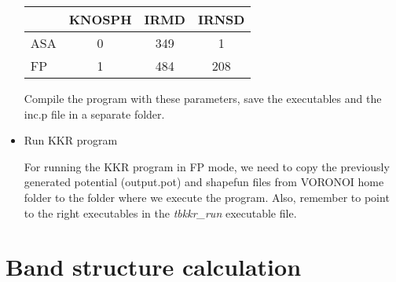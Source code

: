 \documentclass[a4paper,10pt,fullpage]{report}
\begin{document}
\begin{itemize}
\begin{tabular}{ l | c | c |  c }
      & KNOSPH & IRMD & IRNSD \\
  \hline    
  ASA & 0 & 349 & 1 \\
  FP  & 1 & 484 & 208 \\
\end{tabular}

Compile the program with these parameters, save the executables and the inc.p file
in a separate folder.

\item Run KKR program

For running the KKR program in FP mode, we need to copy the 
previously generated potential (output.pot) and shapefun files from VORONOI 
home folder to the folder where we execute the program. Also,
remember to point to the right executables in the \textit{tbkkr\_run} 
executable file.

\end{itemize}



\section{Band structure calculation}
\label{sec:bandstructure}
\end{document}
